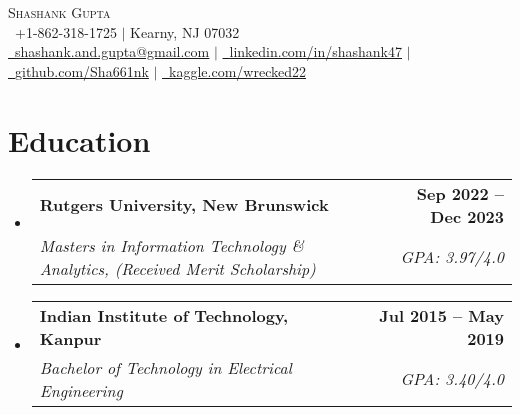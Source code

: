 \documentclass[letterpaper,11pt]{article}
\makeatletter
\newcommand{\resumeSubheading}[4]{
  \vspace{-2pt}\item
    \begin{tabular*}{1.0\textwidth}[t]{l@{\extracolsep{\fill}}r}
      \textbf{#1} & \textbf{\small #2} \\
      \textit{\small#3} & \textit{\small #4} \\
    \end{tabular*}\vspace{-7pt}
}
\newcommand{\resumeSubHeadingListStart}{\begin{itemize}[leftmargin=0.0in, label={}]}
\newcommand{\resumeSubHeadingListEnd}{\end{itemize}}
\makeatother
\begin{document}



\begin{center}
    {\huge \scshape Shashank Gupta} \\ \vspace{1pt}
    \small \raisebox{-0.1\height}\faPhone\ +1-862-318-1725 $|$ Kearny, NJ 07032 \\ \vspace{1pt}
     \href{mailto:shashank.and.gupta@gmail.com}{\raisebox{-0.2\height}\faEnvelope\
     {\color{blue}\underline{shashank.and.gupta@gmail.com}}} $|$ 
    \href{https://www.linkedin.com/in/shashank47/}{\raisebox{-0.2\height}\faLinkedin\ {\color{blue}\underline{linkedin.com/in/shashank47}}} $|$
    \href{https://github.com/Sha661nk}{\raisebox{-0.2\height}\faGithub\ {\color{blue}\underline{github.com/Sha661nk}}} $|$ \href{https://www.kaggle.com/wrecked22}{\raisebox{-0.1\height}\faKaggle\ {\color{blue}\underline{kaggle.com/wrecked22}}}
    \vspace{-8pt}
\end{center}


\section{Education}
  \resumeSubHeadingListStart
    \resumeSubheading
      {Rutgers University, New Brunswick}{Sep 2022 -- Dec 2023}
      {Masters in Information Technology \& Analytics, (Received Merit Scholarship)}{GPA: 3.97/4.0}
    \resumeSubheading
      {Indian Institute of Technology, Kanpur}{Jul 2015 -- May 2019}
      {Bachelor of Technology in Electrical Engineering}{GPA: 3.40/4.0}
  \resumeSubHeadingListEnd
\end{document}
